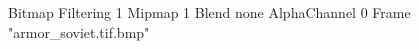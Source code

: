 {Bitmap
	{Filtering 1}
	{Mipmap 1}
	{Blend none}
	{AlphaChannel 0}
	{Frame "armor_soviet.tif.bmp"}
}
